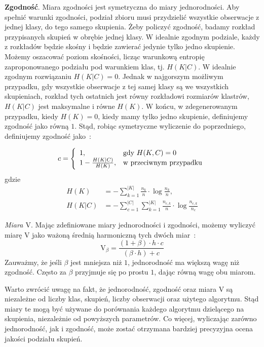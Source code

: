 \documentclass{praca1}
\begin{document}
\textbf{Zgodność}. Miara zgodności jest symetryczna do miary jednorodności. Aby spełnić warunki zgodności, podział zbioru musi przydzielić wszystkie obserwacje z jednej klasy, do tego samego skupienia. Żeby policzyć zgodność, badamy rozkład przypisanych skupień w obrębie jednej klasy. W idealnie zgodnym podziale, każdy z rozkładów będzie skośny i będzie zawierać jedynie tylko jedno skupienie. Możemy oszacować poziom skośności, licząc warunkową entropię zaproponowanego podziału pod warunkiem klas, tj. $H(K|C)$. W idealnie zgodnym rozwiązaniu $H(K|C) = 0$. Jednak w najgorszym możliwym przypadku, gdy wszystkie obserwacje z tej samej klasy są we wszystkich skupieniach, rozkład tych ostatnich jest równy rozkładowi rozmiarów klastrów, $H(K|C)$ jest maksymalne i równe $H(K)$. W końcu, w zdegenerowanym przypadku, kiedy $H(K) = 0$, kiedy mamy tylko jedno skupienie, definiujemy zgodność jako równą $1$. Stąd, robiąc symetryczne wyliczenie do poprzedniego, definiujemy zgodność jako~\cite{Rosenberg2007:vmeasure}:

\begin{equation}
c = \left\{
\begin{array}{l l}     
1, & \text{gdy } H(K,C) = 0\\
1 - \frac{H(K|C)}{H(K)}, & \text{w przeciwnym przypadku}
\end{array}\right.
\end{equation}
gdzie
\begin{align*}
H(K) & = - \sum\limits_{k = 1}^{|K|}\frac{n_k}{n}\cdot \log{\frac{n_k}{n}},  \\
H(K|C) & = - \sum\limits_{c = 1}^{|C|}\sum\limits_{k = 1}^{|K|}\frac{n_{c,k}}{n}\cdot \log{\frac{n_{c,k}}{n_c}}
\end{align*}

\emph{Miara $\textrm{V}$}. Mając zdefiniowane miary jednorodności i zgodności, możemy wyliczyć miarę $\textrm{V}$ jako ważoną średnią harmoniczną tych dwóch miar~\cite{Rosenberg2007:vmeasure}:
\begin{equation}
\textrm{V}_{\beta} = \frac{(1+\beta)\cdot h \cdot c}{(\beta \cdot h) + c}
\end{equation}
Zauważmy, że jeśli $\beta$ jest mniejsza niż $1$, jednorodność ma większą wagę niż zgodność. Często za $\beta$ przyjmuje się po prostu $1$, dając równą wagę obu miarom.

Warto zwrócić uwagę na fakt, że jednorodność, zgodność oraz miara V są niezależne od liczby klas, skupień, liczby obserwacji oraz użytego algorytmu. Stąd miary te mogą być używane do porównania każdego algorytmu dzielącego na skupienia, niezależnie od powyższych parametrów. Co więcej, wyliczając zarówno jednorodność, jak i zgodność, może zostać otrzymana bardziej precyzyjna ocena jakości podziału skupień.
\end{document}
